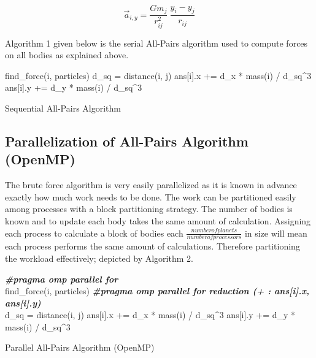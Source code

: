 \begin{equation} \label{eq:5}
\vec{a}_{i, y} = \frac{Gm_j}{r_{ij}^2} \: 
\frac{y_i - y_j}{r_{ij}}
\end{equation}

Algorithm 1 given below is the serial All-Pairs algorithm used to compute forces on all bodies as explained above.


\begin{algorithm}
\DontPrintSemicolon
{}
 {
   {
    find\_force(i, particles) \;
  }
}
\BlankLine
{}
 {
   {
     {
       d\_sq = distance(i, j) \;
       ans[i].x += d\_x * mass(i) / d\_sq\^{}3 \;
       ans[i].y += d\_y * mass(i) / d\_sq\^{}3 \;
    }
  }
}
\label{algo:1}
\caption{Sequential All-Pairs Algorithm}
\end{algorithm}

\subsection{Parallelization of All-Pairs Algorithm (OpenMP)}

The brute force algorithm is very easily parallelized as it is known in advance exactly how much work needs to be done. The work can be partitioned easily among processes with a block partitioning strategy. The number of bodies is known and to update each body takes the same amount of calculation. Assigning each process to calculate a block of bodies each $\frac{number of planets}{number of processors}$ in size will mean each process performs the same amount of calculations. Therefore partitioning the workload effectively; depicted by Algorithm 2.

\begin{algorithm}
\DontPrintSemicolon
{}
 {
  \textbf{\textit{\#pragma omp parallel for}} \\
   {
    find\_force(i, particles) \;
  }
}
\BlankLine
{}
 {
  \textbf{\textit{\#pragma omp parallel for reduction (+ : ans[i].x, ans[i].y)}} \\
   {
     {
       d\_sq = distance(i, j) \;
       ans[i].x += d\_x * mass(i) / d\_sq\^{}3 \;
       ans[i].y += d\_y * mass(i) / d\_sq\^{}3 \;
    }
  }
}
\label{algo:2}
\caption{Parallel All-Pairs Algorithm (OpenMP)}
\end{algorithm}

